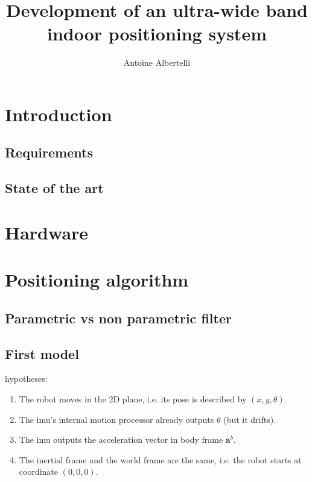 \documentclass[a4paper]{scrreprt}
\title{Development of an ultra-wide band indoor positioning system}
\author{Antoine Albertelli}
\begin{document}

\maketitle
\tableofcontents

\chapter{Introduction}

\section{Requirements}

\section{State of the art}

\chapter{Hardware}

\chapter{Positioning algorithm}

\section{Parametric vs non parametric filter}


\section{First model}

hypotheses:

\begin{enumerate}
    \item The robot moves in the 2D plane, i.e. its pose is described by $\left( x, y, \theta \right)$.
    \item The \gls{imu}'s internal motion processor already outputs $\theta$ (but it drifts).
    \item The \gls{imu} outputs the acceleration vector in body frame $\mathbf{a}^b$.
    \item The inertial frame and the world frame are the same, i.e. the robot starts at coordinate $\left( 0, 0, 0 \right)$.
\end{enumerate}
\end{document}
